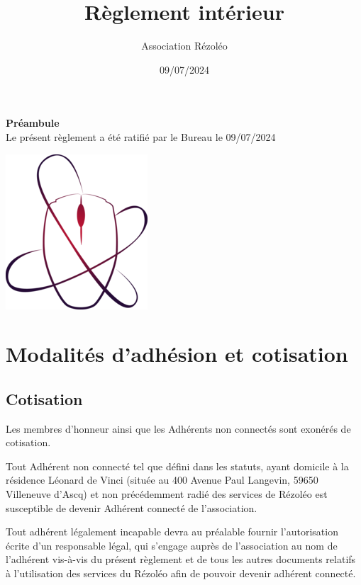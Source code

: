 \documentclass[12pt, a4paper]{article}
\begin{document}
	\title{Règlement intérieur}
	\author{Association Rézoléo}
	\date{09/07/2024}
	\maketitle

    \begin{center}
	   \textbf{Préambule}\\
          Le présent règlement a été ratifié par le Bureau le 09/07/2024

        \vspace{3cm}
        \includegraphics[scale=2]{rezoleo_logo.png}
          
    \end{center}

	\newpage

	\tableofcontents

	\newpage

	\section{Modalités d'adhésion et cotisation}

	\subsection{Cotisation}

	Les membres d'honneur ainsi que les Adhérents non connectés sont exonérés de cotisation.

	\bigskip

	Tout Adhérent non connecté tel que défini dans les statuts, ayant domicile à la
	résidence Léonard de Vinci (située au 400 Avenue Paul Langevin, 59650
	Villeneuve d'Ascq) et non précédemment radié des services de Rézoléo est
	susceptible de devenir Adhérent connecté de l'association.

	\bigskip

	Tout adhérent légalement incapable devra au préalable fournir l'autorisation écrite
	d'un responsable légal, qui s'engage auprès de l'association au nom de l'adhérent
	vis-à-vis du présent règlement et de tous les autres documents relatifs à l'utilisation
	des services du Rézoléo afin de pouvoir devenir adhérent connecté.
\end{document}
